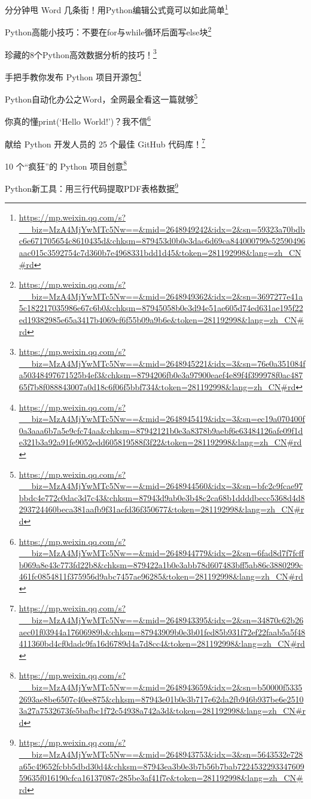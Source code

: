 \documentclass[]{ctexbook}
\renewcommand{\href}[2]{#2\footnote{\url{#1}}}
\begin{document}
\href{https://mp.weixin.qq.com/s?__biz=MzA4MjYwMTc5Nw==\&mid=2648949242\&idx=2\&sn=59323a70bdbc6e671705654c8610435d\&chksm=879453d0b0e3dac6d69ca844000799e52590496aac015c3592754c7d360b7e4968331bdd1d45\&token=281192998\&lang=zh_CN\#rd}{分分钟甩 Word 几条街！用Python编辑公式竟可以如此简单}

\href{https://mp.weixin.qq.com/s?__biz=MzA4MjYwMTc5Nw==\&mid=2648949362\&idx=2\&sn=3697277e41a5c182217035986e67c6b0\&chksm=87945058b0e3d94e51ae605d74ed631ae195f22ed19382985e65a3417b4069cf6f55b09a9b6e\&token=281192998\&lang=zh_CN\#rd}{Python高能小技巧：不要在for与while循环后面写else块}

\href{https://mp.weixin.qq.com/s?__biz=MzA4MjYwMTc5Nw==\&mid=2648945221\&idx=3\&sn=76e0a351084fa50348497671525b4ef3\&chksm=8794206fb0e3a97900eaef4e89f4f399978f0ac48765f7b8f088843007a0d18c6f06f5bbf734\&token=281192998\&lang=zh_CN\#rd}{珍藏的8个Python高效数据分析的技巧！}

\href{https://mp.weixin.qq.com/s?__biz=MzA4MjYwMTc5Nw==\&mid=2648945419\&idx=3\&sn=ec19a070400f0a3aaa6b7a5e9cfc74aa\&chksm=87942121b0e3a8378b9aebf6e63484126afe09f1de321b3a92a91fe9052edd605819588f3f22\&token=281192998\&lang=zh_CN\#rd}{手把手教你发布 Python 项目开源包}

\href{https://mp.weixin.qq.com/s?__biz=MzA4MjYwMTc5Nw==\&mid=2648944560\&idx=3\&sn=bfc2c9fcae97bbdc4e772c0dac3d7c43\&chksm=87943d9ab0e3b48c2ca68b1ddddbecc5368d4d8293724460beca381aafb9f31acfd36f350677\&token=281192998\&lang=zh_CN\#rd}{Python自动化办公之Word，全网最全看这一篇就够}

\href{https://mp.weixin.qq.com/s?__biz=MzA4MjYwMTc5Nw==\&mid=2648944779\&idx=2\&sn=6fad8d7f7fcffb069a8e43c773fd22b8\&chksm=879422a1b0e3abb78d607483bff5ab86c3880299c461fc0854811f375956d9abc7457ae96285\&token=281192998\&lang=zh_CN\#rd}{你真的懂print(`Hello World!')？我不信}

\href{https://mp.weixin.qq.com/s?__biz=MzA4MjYwMTc5Nw==\&mid=2648943395\&idx=2\&sn=34870c62b26aec01f03944a17606989b\&chksm=87943909b0e3b01fed85b931f72ef22faab5a5f48411360bd4cf0dadc9fa16d6789d4a7d8cc4\&token=281192998\&lang=zh_CN\#rd}{献给 Python 开发人员的 25 个最佳 GitHub 代码库！}

\href{https://mp.weixin.qq.com/s?__biz=MzA4MjYwMTc5Nw==\&mid=2648943659\&idx=2\&sn=b50000f53352693ae8be6507c40ee875\&chksm=87943e01b0e3b717e62da2fb946b937be6e25103a27a7532673fe5bafbc1f72c54938a742a3d\&token=281192998\&lang=zh_CN\#rd}{10 个``疯狂''的 Python 项目创意}

\href{https://mp.weixin.qq.com/s?__biz=MzA4MjYwMTc5Nw==\&mid=2648943753\&idx=3\&sn=5643532e728a65c49652fcbb5dbd30d4\&chksm=87943ea3b0e3b7b56b7bab722453229334760959635f016190cfca16137087c285be3af41f7e\&token=281192998\&lang=zh_CN\#rd}{Python新工具：用三行代码提取PDF表格数据}
\end{document}
